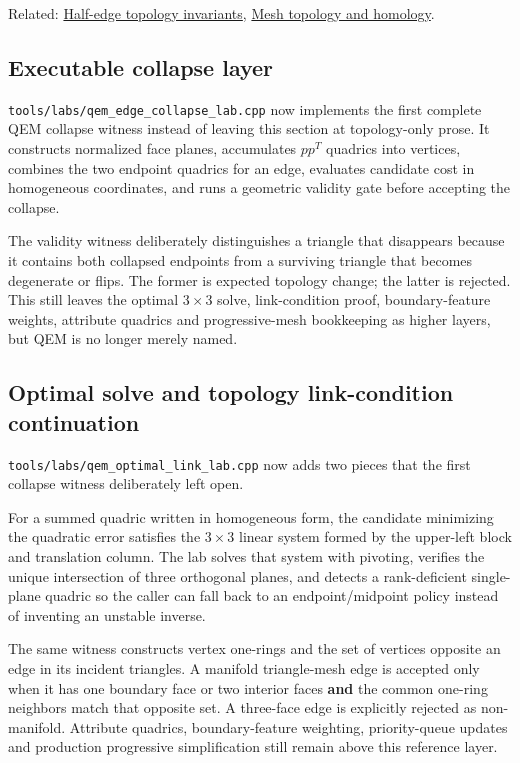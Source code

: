 Related: \hyperref[appendix-faac749c9cdd]{Half-edge topology invariants}, \hyperref[appendix-e38976cbbf86]{Mesh topology and homology}.

\subsection{Executable collapse layer}\label{appendix-89db9fe1bc8a-executable-collapse-layer}

\texttt{tools/labs/qem\_edge\_collapse\_lab.cpp} now implements the first complete QEM collapse witness instead of leaving this section at topology-only prose. It constructs normalized face planes, accumulates \(pp^T\) quadrics into vertices, combines the two endpoint quadrics for an edge, evaluates candidate cost in homogeneous coordinates, and runs a geometric validity gate before accepting the collapse.

The validity witness deliberately distinguishes a triangle that disappears because it contains both collapsed endpoints from a surviving triangle that becomes degenerate or flips. The former is expected topology change; the latter is rejected. This still leaves the optimal \(3\times3\) solve, link-condition proof, boundary-feature weights, attribute quadrics and progressive-mesh bookkeeping as higher layers, but QEM is no longer merely named.

\subsection{Optimal solve and topology link-condition continuation}\label{appendix-89db9fe1bc8a-optimal-solve-and-topology-link-condition-continuation}

\texttt{tools/labs/qem\_optimal\_link\_lab.cpp} now adds two pieces that the first collapse witness deliberately left open.

For a summed quadric written in homogeneous form, the candidate minimizing the quadratic error satisfies the \(3\times3\) linear system formed by the upper-left block and translation column. The lab solves that system with pivoting, verifies the unique intersection of three orthogonal planes, and detects a rank-deficient single-plane quadric so the caller can fall back to an endpoint/midpoint policy instead of inventing an unstable inverse.

The same witness constructs vertex one-rings and the set of vertices opposite an edge in its incident triangles. A manifold triangle-mesh edge is accepted only when it has one boundary face or two interior faces \textbf{and} the common one-ring neighbors match that opposite set. A three-face edge is explicitly rejected as non-manifold. Attribute quadrics, boundary-feature weighting, priority-queue updates and production progressive simplification still remain above this reference layer.
